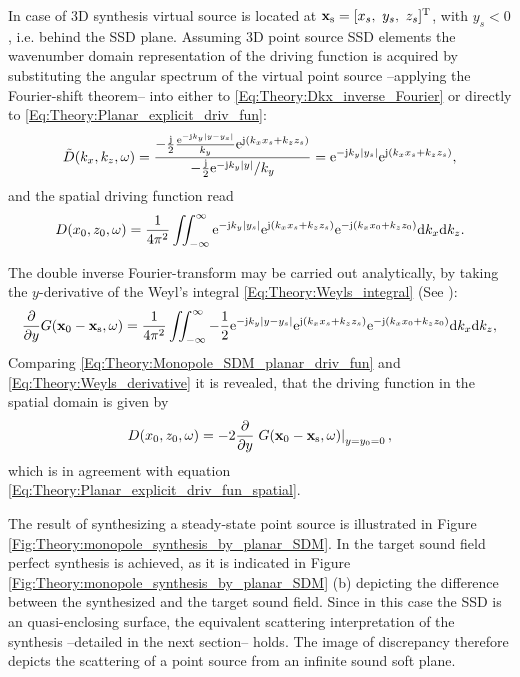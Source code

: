 \vspace{3mm}
In case of 3D synthesis virtual source is located at $\mathbf{x}_{\mathrm{s}} = [x_s,\ y_s,\ z_s]^{\mathrm{T}}$, with $y_s<0$, i.e. behind the SSD plane.
Assuming 3D point source SSD elements the wavenumber domain representation of the driving function is acquired by substituting the angular spectrum of the virtual point source --applying the Fourier-shift theorem-- into either to \eqref{Eq:Theory:Dkx_inverse_Fourier} or directly to \eqref{Eq:Theory:Planar_explicit_driv_fun}:
\begin{equation}
\tilde{D}(k_x,k_z,\omega) =  \frac{-\frac{\mathrm{j}}{2} \frac{ \mathrm{e}^{-\mathrm{j} k_y | y - y_s|} }{ k_y} \mathrm{e}^{\mathrm{j} (k_x x_s +k_z z_s)} }{-\frac{\mathrm{j}}{2} \mathrm{e}^{-\mathrm{j} k_y | y |} / k_y   } = \mathrm{e}^{-\mathrm{j} k_y |y_s|}\mathrm{e}^{\mathrm{j} (k_x x_s +k_z z_s)},
\end{equation}
and the spatial driving function read
\begin{equation}
D(x_0,z_0,\omega) = \frac{1}{4\pi^2} \iint_{-\infty}^{\infty} \mathrm{e}^{-\mathrm{j} k_y |y_s|}\mathrm{e}^{\mathrm{j} (k_x x_s +k_z z_s)} \mathrm{e}^{-\mathrm{j} (k_x x_0 + k_z z_0)} \mathrm{d} k_x \mathrm{d} k_z.
\label{Eq:Theory:Monopole_SDM_planar_driv_fun}
\end{equation}

The double inverse Fourier-transform may be carried out analytically, by taking the $y$-derivative of the Weyl's integral \eqref{Eq:Theory:Weyls_integral} (See \cite[(2.65)]{Williams1999}):
\begin{equation}
\frac{\partial}{\partial y} G(\mathbf{x}_0 - \mathbf{x}_{\mathrm{s}},\omega ) = 
\frac{1}{4\pi^2} \iint_{-\infty}^{\infty} -\frac{1}{2} \mathrm{e}^{ -\mathrm{j} k_y  | y - y_s |  }
\mathrm{e}^{\mathrm{j} (k_x x_s + k_z z_s)} \mathrm{e}^{-\mathrm{j} (k_x x_0 + k_z z_0)} \mathrm{d} k_x \mathrm{d} k_z,
\label{Eq:Theory:Weyls_derivative}
\end{equation}
Comparing \eqref{Eq:Theory:Monopole_SDM_planar_driv_fun} and \eqref{Eq:Theory:Weyls_derivative} it is revealed, that the driving function in the spatial domain is given by
\begin{equation}
D(x_0,z_0,\omega) = -2 \frac{\partial}{\partial y} \left. G(\mathbf{x}_0 - \mathbf{x}_{\mathrm{s}},\omega )\right|_{y = y_0 = 0},
\end{equation}
which is in agreement with equation \eqref{Eq:Theory:Planar_explicit_driv_fun_spatial}.

The result of synthesizing a steady-state point source is illustrated in Figure \ref{Fig:Theory:monopole_synthesis_by_planar_SDM}. In the target sound field perfect synthesis is achieved, as it is indicated in Figure \ref{Fig:Theory:monopole_synthesis_by_planar_SDM} (b) depicting the difference between the synthesized and the target sound field. Since in this case the SSD is an quasi-enclosing surface, the equivalent scattering interpretation of the synthesis --detailed in the next section-- holds. The image of discrepancy therefore depicts the scattering of a point source from an infinite sound soft plane. 

